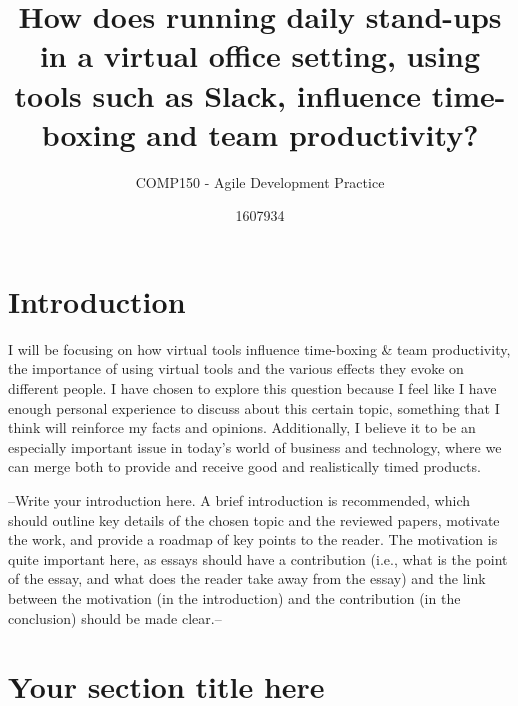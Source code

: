 \documentclass{scrartcl}
\title{How does running daily stand-ups in a virtual office setting, using tools such as Slack, influence time-boxing and team productivity?}
\subtitle{COMP150 - Agile Development Practice}
\author{1607934}
\begin{document}
\maketitle


\section{Introduction}

I will be focusing on how virtual tools influence time-boxing & team productivity, the importance of using virtual tools and the various effects they evoke on different people. I have chosen to explore this question because I feel like I have enough personal experience to discuss about this certain topic, something that I think will reinforce my facts and opinions. Additionally, I believe it to be an especially important issue in today's world of business and technology, where we can merge both to provide and receive good and realistically timed products.

--Write your introduction here. A brief introduction is recommended, which should outline key details of the chosen topic and the reviewed papers, motivate the work, and provide a roadmap of key points to the reader. The motivation is quite important here, as essays should have a contribution (i.e., what is the point of the essay, and what does the reader take away from the essay) and the link between the motivation (in the introduction) and the contribution (in the conclusion) should be made clear.--

\section{Your section title here}
\end{document}
